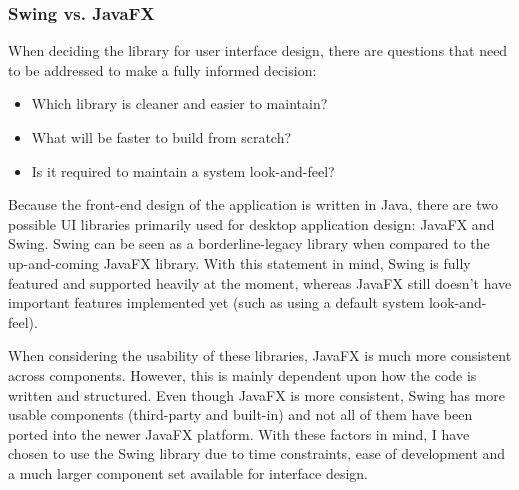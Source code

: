 \subsubsection{Swing vs. JavaFX}

When deciding the library for user interface design, there are questions that need to be addressed to make a fully informed decision:

\begin{itemize}
	\item{Which library is cleaner and easier to maintain?}
	\item{What will be faster to build from scratch?}
	\item{Is it required to maintain a system look-and-feel?}
\end{itemize}

Because the front-end design of the application is written in Java, there are two possible UI libraries primarily used for desktop application design: JavaFX and Swing. Swing can be seen as a borderline-legacy library when compared to the up-and-coming JavaFX library. With this statement in mind, Swing is fully featured and supported heavily at the moment, whereas JavaFX still doesn’t have important features implemented yet (such as using a default system look-and-feel).

When considering the usability of these libraries, JavaFX is much more consistent across components. However, this is mainly dependent upon how the code is written and structured. Even though JavaFX is more consistent, Swing has more usable components (third-party and built-in) and not all of them have been ported into the newer JavaFX platform. With these factors in mind, I have chosen to use the Swing library due to time constraints, ease of development and a much larger component set available for interface design.
